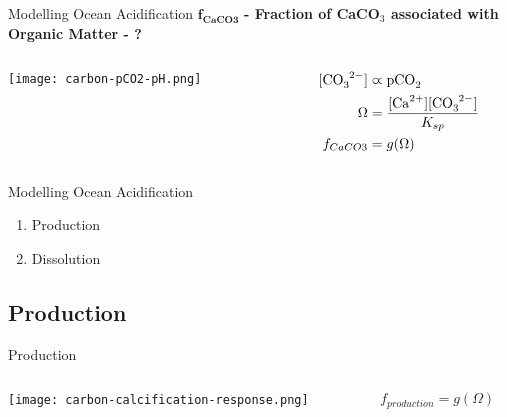 \begin{frame}{Modelling Ocean Acidification}
    $\mathbf{f_{CaCO3}}$ \textbf{- Fraction of CaCO$_3$ associated with Organic Matter - {\color{QESdarkblue} \ce{\Omega}?}}
    
    \bigskip
    \begin{columns}
        \begin{column}{0.5\linewidth}
            \centering
            \texttt{[image: carbon-pCO2-pH.png]}
        \end{column}
        \begin{column}{0.5\linewidth}
            \begin{align*}
                \ce{[CO3^{2-}]} &\varpropto \ce{pCO2}\\
                \Omega &= \frac{\ce{[Ca^{2+}][CO3^{2-}]}}{K_{sp}} \\
                f_{CaCO3} &= g(\Omega) \\
            \end{align*}
            
        \end{column}
    \end{columns}
\end{frame}

\begin{frame}{Modelling Ocean Acidification}
    \begin{enumerate}
        \item {} Production
        \item {} Dissolution
    \end{enumerate}
\end{frame}

\subsection{Production}

\begin{frame}{Production}
    \begin{columns}
        \begin{column}{0.45\linewidth}
            \centering
            \texttt{[image: carbon-calcification-response.png]}
        \end{column}
        \begin{column}{0.55\linewidth}
            $$f_{production} = g(\Omega)$$
        \end{column}
    \end{columns}
\end{frame}

